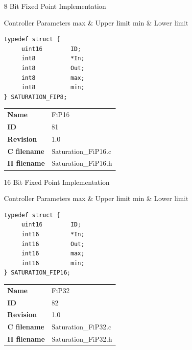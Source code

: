 8 Bit Fixed Point Implementation

\begin{XtoCtabular}{Controller Parameters}
max & Upper limit\tabularnewline
\hline
min & Lower limit\tabularnewline
\hline
\end{XtoCtabular}

\begin{lstlisting}
typedef struct {
     uint16        ID;
     int8          *In;
     int8          Out;
     int8          max;
     int8          min;
} SATURATION_FIP8;
\end{lstlisting}

\ifdefined \AddTestReports
{}
\fi
{}
\nopagebreak[0]
\begin{tabular}{l l}
\textbf{Name} & FiP16 \tabularnewline
\textbf{ID} & 81 \tabularnewline
\textbf{Revision} & 1.0 \tabularnewline
\textbf{C filename} & Saturation\_FiP16.c \tabularnewline
\textbf{H filename} & Saturation\_FiP16.h \tabularnewline
\end{tabular}
\vspace{1ex}

16 Bit Fixed Point Implementation

\begin{XtoCtabular}{Controller Parameters}
max & Upper limit\tabularnewline
\hline
min & Lower limit\tabularnewline
\hline
\end{XtoCtabular}

\begin{lstlisting}
typedef struct {
     uint16        ID;
     int16         *In;
     int16         Out;
     int16         max;
     int16         min;
} SATURATION_FIP16;
\end{lstlisting}

\ifdefined \AddTestReports
{}
\fi
{}
\nopagebreak[0]
\begin{tabular}{l l}
\textbf{Name} & FiP32 \tabularnewline
\textbf{ID} & 82 \tabularnewline
\textbf{Revision} & 1.0 \tabularnewline
\textbf{C filename} & Saturation\_FiP32.c \tabularnewline
\textbf{H filename} & Saturation\_FiP32.h \tabularnewline
\end{tabular}
\vspace{1ex}

